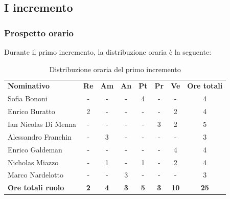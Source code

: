 \documentclass[../piano-di-progetto.tex]{subfiles}
\begin{document}
  \subsection{I incremento}

  \subsubsection{Prospetto orario}
 Durante il primo incremento, la distribuzione oraria è la seguente:
  \begin{table}[H]
    \centering
    \begin{tabular}{lccccccc}
    \rowcolor{lightgray}
    \textbf{Nominativo}       & \textbf{Re} & \textbf{Am} & \textbf{An} & \textbf{Pt} & \textbf{Pr} & \textbf{Ve} & \textbf{Ore totali} \\
Sofia Bononi              & -           & -           & -           & 4           & -           & -           & 4                   \\
Enrico Buratto            & 2           & -           & -           & -           & -           & 2           & 4                   \\
Ian Nicolas Di Menna      & -           & -           & -           & -           & 3           & 2           & 5                   \\
Alessandro Franchin       & -           & 3           & -           & -           & -           & -           & 3                   \\
Enrico Galdeman           & -           & -           & -           & -           & -           & 4           & 4                   \\
Nicholas Miazzo           & -           & 1           & -           & 1           & -           & 2           & 4                   \\
Marco Nardelotto          & -           & -           & 3           & -           & -           & -           & 3                   \\
\textbf{Ore totali ruolo} & \textbf{2}  & \textbf{4}  & \textbf{3}  & \textbf{5}  & \textbf{3}  & \textbf{10}  & \textbf{25}        
    
    \end{tabular}
    \caption{Distribuzione oraria del primo incremento}
  \end{table}
\end{document}
